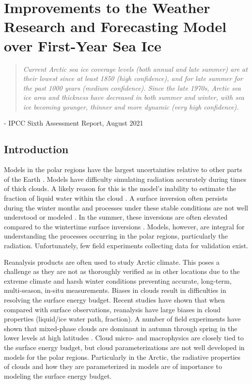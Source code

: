 \chapter{Improvements to the Weather Research and Forecasting Model over First-Year Sea Ice}
\vspace{1 cm}
\begin{spacing}{1} \begin{quote} 
\noindent \emph{Current Arctic sea ice coverage levels (both annual and late summer) are at their lowest since at least 1850 (high confidence), and for late summer for the past 1000 years (medium confidence). Since the late 1970s, Arctic sea ice area and thickness have decreased in both summer and winter, with sea ice becoming younger, thinner and more dynamic (very high confidence).}\end{quote}
\hspace{6 cm} - IPCC Sixth Assessment Report, August 2021  
\end{spacing}
\doublespacing
\section{Introduction}

Models in the polar regions have the largest uncertainties relative to other parts of the Earth \citep{holland:2003, AACI:05}. Models have difficulty simulating radiation accurately during times of thick clouds. A likely reason for this is the model’s inability to estimate the fraction of liquid water within the cloud \citep{graham:2017}. A surface inversion often persists during the winter months and processes under these stable conditions are not well understood or modeled \citep{tastula:2012}. In the summer, these inversions are often elevated compared to the wintertime surface inversions \citep{serreze:1992}. Models, however, are integral for understanding the processes occurring in the polar regions, particularly the radiation. Unfortunately, few field experiments collecting data for validation exist.
 
Reanalysis products are often used to study Arctic climate. This poses a challenge as they are not as thoroughly verified as in other locations due to the extreme climate and harsh winter conditions preventing accurate, long-term, multi-season, in-situ measurements. Biases in clouds result in difficulties in resolving the surface energy budget. Recent studies have shown that when compared with surface observations, reanalysis have large biases in cloud properties (liquid/ice water path, fraction). A number of field experiments have shown that mixed-phase clouds are dominant in autumn through spring in the lower levels at high latitudes \citep{intrieri:2002, wang:2005}. Cloud micro- and macrophysics are closely tied to the surface energy budget, but cloud parameterizations are not well developed in models for the polar regions. Particularly in the Arctic, the radiative properties of clouds and how they are parameterized in models are of importance to modeling the surface energy budget.
 
